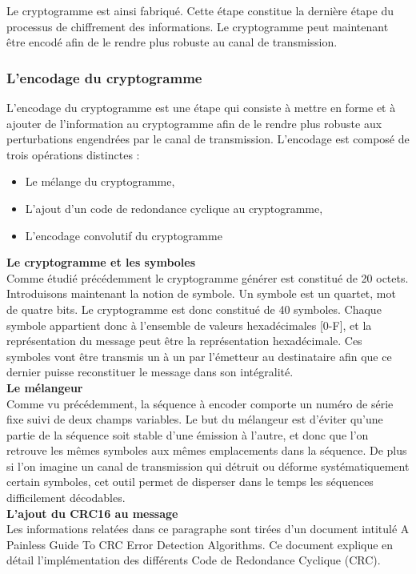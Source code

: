 Le cryptogramme est ainsi fabriqué. Cette étape constitue la dernière étape du processus de chiffrement des informations. Le cryptogramme peut maintenant être encodé afin de le rendre plus robuste au canal de transmission.

\subsubsection{L’encodage du cryptogramme}
L’encodage du cryptogramme est une étape qui consiste à mettre en forme et à ajouter de l’information au cryptogramme afin de le rendre plus robuste aux perturbations engendrées par le canal de transmission. L’encodage est composé de trois opérations distinctes :
\begin{itemize}
\item Le mélange du cryptogramme,
\item L’ajout d’un code de redondance cyclique au cryptogramme,
\item L’encodage convolutif du cryptogramme\\
\end{itemize}


\textbf{Le cryptogramme et les symboles}\\
Comme étudié précédemment le cryptogramme générer est constitué de 20 octets. Introduisons maintenant la notion de symbole. Un symbole est un quartet, mot de quatre bits. Le cryptogramme est donc constitué de 40 symboles. Chaque symbole appartient donc à l’ensemble de valeurs hexadécimales [0-F], et la représentation du message peut être la représentation hexadécimale. Ces symboles vont être transmis un à un par l’émetteur au destinataire afin que ce dernier puisse reconstituer le message dans son intégralité.\\

\textbf{Le mélangeur}\\
Comme vu précédemment, la séquence à encoder comporte un numéro de série fixe suivi de deux champs variables. Le but du mélangeur est d’éviter qu’une partie de la séquence soit stable d’une émission à l’autre, et donc que l’on retrouve les mêmes symboles aux mêmes emplacements dans la séquence. De plus si l’on imagine un canal de transmission qui détruit ou déforme systématiquement certain symboles, cet outil permet de disperser dans le temps les séquences difficilement décodables.\\

\textbf{L’ajout du CRC16 au message}\\
Les informations relatées dans ce paragraphe sont tirées d’un document intitulé A Painless Guide To CRC Error Detection Algorithms. Ce document explique en détail l’implémentation des différents Code de Redondance Cyclique (CRC).\\

